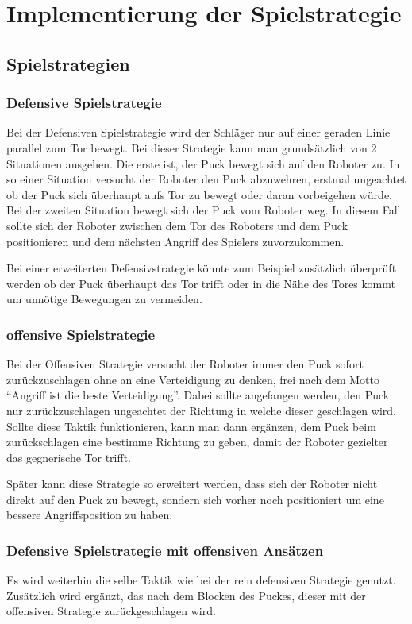 
\chapter{Implementierung der Spielstrategie}

\section{Spielstrategien}
\subsection{Defensive Spielstrategie}
Bei der Defensiven Spielstrategie wird der Schläger nur auf einer geraden Linie parallel zum Tor bewegt. Bei dieser Strategie kann man grundsätzlich von 2 Situationen ausgehen. Die erste ist, der Puck bewegt sich auf den Roboter zu. In so einer Situation versucht der Roboter den Puck abzuwehren, erstmal ungeachtet ob der Puck sich überhaupt aufs Tor zu bewegt oder daran vorbeigehen würde. Bei der zweiten Situation bewegt sich der Puck vom Roboter weg. In diesem Fall sollte sich der Roboter zwischen dem Tor des Roboters und dem Puck positionieren und dem nächsten Angriff des Spielers zuvorzukommen.

Bei einer erweiterten Defensivstrategie könnte zum Beispiel zusätzlich überprüft werden ob der Puck überhaupt das Tor trifft oder in die Nähe des Tores kommt um unnötige Bewegungen zu vermeiden.

\subsection{offensive Spielstrategie}
Bei der Offensiven Strategie versucht der Roboter immer den Puck sofort zurückzuschlagen ohne an eine Verteidigung zu denken, frei nach dem Motto \enquote{Angriff ist die beste Verteidigung}. Dabei sollte angefangen werden, den Puck nur zurückzuschlagen ungeachtet der Richtung in welche dieser geschlagen wird. Sollte diese Taktik funktionieren, kann man dann ergänzen, dem Puck beim zurückschlagen eine bestimme Richtung zu geben, damit der Roboter gezielter das gegnerische Tor trifft.

Später kann diese Strategie so erweitert werden, dass sich der Roboter nicht direkt auf den Puck zu bewegt, sondern sich vorher noch positioniert um eine bessere Angriffsposition zu haben.

\subsection{Defensive Spielstrategie mit offensiven Ansätzen}
Es wird weiterhin die selbe Taktik wie bei der rein defensiven Strategie genutzt. Zusätzlich wird ergänzt, das nach dem Blocken des Puckes, dieser mit der offensiven Strategie zurückgeschlagen wird.

